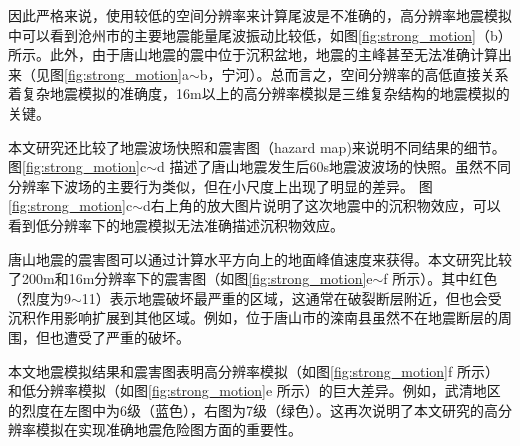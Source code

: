 因此严格来说，使用较低的空间分辨率来计算尾波是不准确的，高分辨率地震模拟中可以看到沧州市的主要地震能量尾波振动比较低，如图\ref{fig:strong_motion}（b）所示。此外，由于唐山地震的震中位于沉积盆地，地震的主峰甚至无法准确计算出来（见图\ref{fig:strong_motion}a$\sim$b，宁河）。总而言之，空间分辨率的高低直接关系着复杂地震模拟的准确度，16m以上的高分辨率模拟是三维复杂结构的地震模拟的关键。

本文研究还比较了地震波场快照和震害图（hazard map)来说明不同结果的细节。图\ref{fig:strong_motion}c$\sim$d 描述了唐山地震发生后60s地震波波场的快照。虽然不同分辨率下波场的主要行为类似，但在小尺度上出现了明显的差异。 图\ref{fig:strong_motion}c$\sim$d右上角的放大图片说明了这次地震中的沉积物效应，可以看到低分辨率下的地震模拟无法准确描述沉积物效应。

唐山地震的震害图可以通过计算水平方向上的地面峰值速度来获得。本文研究比较了200m和16m分辨率下的震害图（如图\ref{fig:strong_motion}e$\sim$f 所示）。其中红色（烈度为9$\sim$11）表示地震破坏最严重的区域，这通常在破裂断层附近，但也会受沉积作用影响扩展到其他区域。例如，位于唐山市的滦南县虽然不在地震断层的周围，但也遭受了严重的破坏。

本文地震模拟结果和震害图表明高分辨率模拟（如图\ref{fig:strong_motion}f 所示）和低分辨率模拟（如图\ref{fig:strong_motion}e 所示）的巨大差异。例如，武清地区的烈度在左图中为6级（蓝色），右图为7级（绿色）。这再次说明了本文研究的高分辨率模拟在实现准确地震危险图方面的重要性。





